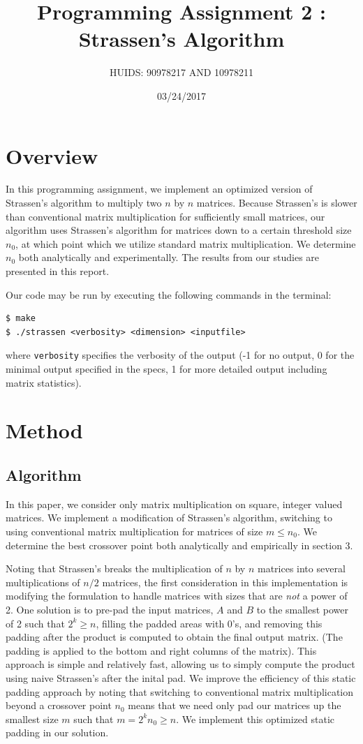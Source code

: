 \documentclass[a4paper]{article}
\title{Programming Assignment 2 : Strassen's Algorithm}
\author{HUIDS: 90978217 AND 10978211}
\date{03/24/2017}
\begin{document}
\maketitle

\section{Overview}
In this programming assignment, we implement an optimized version of Strassen's algorithm to multiply two $n$ by $n$ matrices. Because Strassen's is slower than conventional matrix multiplication for sufficiently small matrices, our algorithm uses Strassen's algorithm for matrices down to a certain threshold size $n_0$, at which point which we utilize standard matrix multiplication. We determine $n_0$ both analytically and experimentally. The results from our studies are presented in this report.

Our code may be run by executing the following commands in the terminal:
\begin{verbatim}
$ make
$ ./strassen <verbosity> <dimension> <inputfile>
\end{verbatim}
where \texttt{verbosity} specifies the verbosity of the output (-1 for no output, 0 for the minimal output specified in the specs, 1 for more detailed output including matrix statistics).

\section{Method}
\subsection{Algorithm}
In this paper, we consider only matrix multiplication on square, integer valued matrices. We implement a modification of Strassen's algorithm, switching to using conventional matrix multiplication for matrices of size $m \leq n_0$. We determine the best crossover point both analytically and empirically in section 3.

Noting that Strassen's breaks the multiplication of $n$ by $n$ matrices into several multiplications of $n/2$ matrices, the first consideration in this implementation is modifying the formulation to handle matrices with sizes that are \textit{not} a power of 2. One solution is to pre-pad the input matrices, $A$ and $B$ to the smallest power of 2 such that $2^k \geq n$, filling the padded areas with 0's, and removing this padding after the product is computed to obtain the final output matrix. (The padding is applied to the bottom and right columns of the matrix). This approach is simple and relatively fast, allowing us to simply compute the product using naive Strassen's after the inital pad. We improve the efficiency of this static padding approach by noting that switching to conventional matrix multiplication beyond a crossover point $n_0$ means that we need only pad our matrices up the smallest size $m$ such that $m = 2^k n_0 \geq n$. We implement this optimized static padding in our solution.
\end{document}
